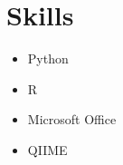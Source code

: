 \documentclass[11pt,a4paper,]{moderncv}
\providecommand{\tightlist}{%
	\setlength{\itemsep}{0pt}\setlength{\parskip}{0pt}}
\begin{document}
\hypertarget{skills}{%
\section{Skills}\label{skills}}

\begin{itemize}
\tightlist
\item
  Python
\item
  R
\item
  Microsoft Office
\item
  QIIME
\end{itemize}
\end{document}
